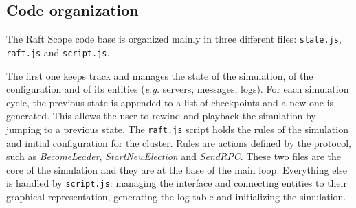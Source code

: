 \subsection{Code organization}
The Raft Scope code base is organized mainly in three different files:
\texttt{state.js}, \texttt{raft.js} and \texttt{script.js}.

The first one keeps track and manages the state of the simulation,
of the configuration and of its entities (\emph{e.g.} servers, messages, logs).
For each simulation cycle, the previous state is appended to a list of checkpoints
and a new one is generated. This allows the user to rewind and playback
the simulation by jumping to a previous state.
The \texttt{raft.js} script holds the rules of the simulation and initial configuration for the cluster.
Rules are actions defined by the protocol, such as \textit{BecomeLeader},
\textit{StartNewElection} and \textit{SendRPC}.
These two files are the core of the simulation and they are at the base of the main loop.
Everything else is handled by \texttt{script.js}: managing the interface and connecting entities
to their graphical representation, generating the log table and initializing the simulation.
